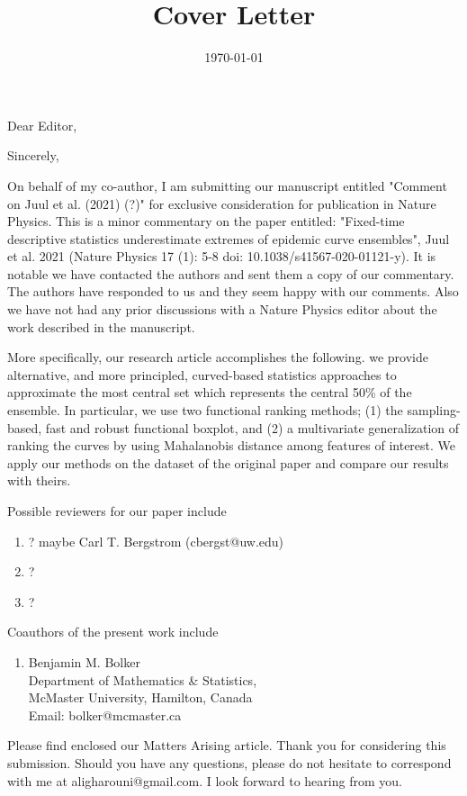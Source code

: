 \documentclass[10pt,a4paper,roman]{moderncv}
\title{Cover Letter}
\begin{document}
\recipient{\leavevmode}{ }

\date{\today}
\opening{Dear Editor,}

\closing{Sincerely,}
\makelettertitle

On behalf of my co-author, I am submitting our manuscript entitled "Comment on Juul et al. (2021) (?)" for exclusive consideration for publication in Nature Physics. This is a minor commentary on the paper entitled: "Fixed-time descriptive statistics underestimate extremes of epidemic curve ensembles", Juul et al. 2021 (Nature Physics 17 (1): 5-8 doi: 10.1038/s41567-020-01121-y). It is notable we have contacted the authors and sent them a copy of our commentary. The authors have responded to us and they seem happy with our comments. Also we have not had any prior discussions with a Nature Physics editor about the work described in the manuscript. 

More specifically, our research article accomplishes the following.
we provide alternative, and more principled, curved-based statistics approaches to approximate the most central set which represents the central 50\% of the ensemble. In particular, we use two functional ranking methods; (1) the sampling-based, fast and robust functional boxplot, and (2) a multivariate generalization of ranking the curves by using Mahalanobis distance among features of interest. We apply our methods on the dataset of the original paper and compare our results with theirs.

Possible reviewers for our paper include
\begin{enumerate}
\item ? maybe Carl T. Bergstrom (cbergst@uw.edu)
\item ?
\item ?
\end{enumerate}

Coauthors of the present work include
\begin{enumerate}
\item Benjamin M. Bolker \\
Department of Mathematics \& Statistics,\\
McMaster University, Hamilton, Canada\\
Email: bolker@mcmaster.ca
\end{enumerate}

Please find enclosed our Matters Arising article. Thank you for considering this submission. Should you have any questions, please do not hesitate to correspond with me at aligharouni@gmail.com. I look forward to hearing from you.
\vspace{0.5cm}

\makeletterclosing
\end{document}
